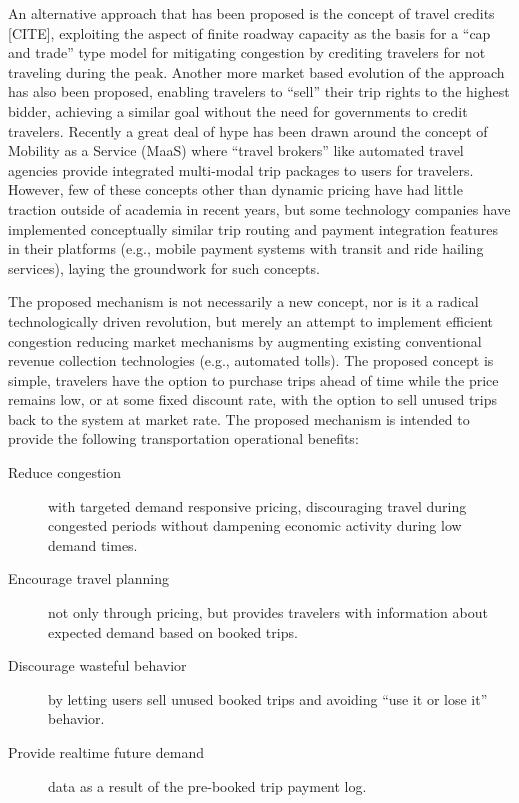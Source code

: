\documentclass{article}
\begin{document}
An alternative approach that has been proposed is the concept of travel credits [CITE], exploiting the aspect of finite roadway capacity as the basis for a ``cap and trade'' type model for mitigating congestion by crediting travelers for not traveling during the peak. Another more market based evolution of the approach has also been proposed, enabling travelers to ``sell'' their trip rights to the highest bidder, achieving a similar goal without the need for governments to credit travelers. Recently a great deal of hype has been drawn around the concept of Mobility as a Service (MaaS) where ``travel brokers'' like automated travel agencies provide integrated multi-modal trip packages to users for travelers. However, few of these concepts other than dynamic pricing have had little traction outside of academia in recent years, but some technology companies have implemented conceptually similar trip routing and payment integration features in their platforms (e.g., mobile payment systems with transit and ride hailing services), laying the groundwork for such concepts. 

The proposed mechanism is not necessarily a new concept, nor is it a radical technologically driven revolution, but merely an attempt to implement efficient congestion reducing market mechanisms by augmenting existing conventional revenue collection technologies (e.g., automated tolls). The proposed concept is simple, travelers have the option to purchase trips ahead of time while the price remains low, or at some fixed discount rate, with the option to sell unused trips back to the system at market rate. The proposed mechanism is intended to provide the following transportation operational benefits:
\begin{description}
	\item[Reduce congestion] with targeted demand responsive pricing, discouraging travel during congested periods without dampening economic activity during low demand times.
	
	\item[Encourage travel planning] not only through pricing, but provides travelers with information about expected demand based on booked trips.
	
	\item[Discourage wasteful behavior] by letting users sell unused booked trips and avoiding ``use it or lose it'' behavior.
	
	\item[Provide realtime future demand] data as a result of the pre-booked trip payment log.
\end{description}
\end{document}
